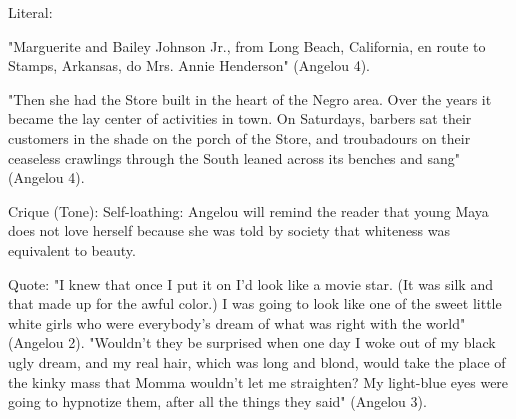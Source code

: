 
Literal:

"Marguerite and Bailey Johnson Jr., from Long Beach, California, en route to Stamps, Arkansas, do Mrs. Annie Henderson" (Angelou 4).

"Then she had the Store built in the heart of the Negro area. Over the years it became the lay center of activities in town. On Saturdays, barbers sat their customers in the shade on the porch of the Store, and troubadours on their ceaseless crawlings through the South leaned across its benches and sang" (Angelou 4).

Crique (Tone): 
Self-loathing: Angelou will remind the reader that young Maya does not love herself because she was told by society that whiteness was equivalent to beauty.

Quote:
"I knew that once I put it on I'd look like a movie star. (It was silk and that made up for the awful color.) I was going to look like one of the sweet little white girls who were everybody's dream of what was right with the world" (Angelou 2).
"Wouldn't they be surprised when one day I woke out of my black ugly dream, and my real hair, which was long and blond, would take the place of the kinky mass that Momma wouldn't let me straighten? My light-blue eyes were going to hypnotize them, after all the things they said" (Angelou 3).


